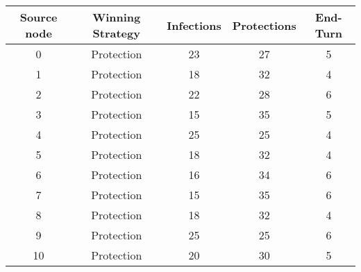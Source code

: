 \documentclass[results.tex]{subfiles}
\begin{document}
    \begin{center}
        \begin{tabular}{| c || c | c | c | c |}
            \hline
            {\bfseries Source node} & {\bfseries Winning Strategy} & {\bfseries Infections} & {\bfseries Protections}
            & {\bfseries End-Turn}
            \\  %
            \hline\hline
            0                       & Protection                   & 23                     & 27                      & 5                    \\
            \hline
            1                       & Protection                   & 18                     & 32                      & 4                    \\
            \hline
            2                       & Protection                   & 22                     & 28                      & 6                    \\
            \hline
            3                       & Protection                   & 15                     & 35                      & 5                    \\
            \hline
            4                       & Protection                   & 25                     & 25                      & 4                    \\
            \hline
            5                       & Protection                   & 18                     & 32                      & 4                    \\
            \hline
            6                       & Protection                   & 16                     & 34                      & 6                    \\
            \hline
            7                       & Protection                   & 15                     & 35                      & 6                    \\
            \hline
            8                       & Protection                   & 18                     & 32                      & 4                    \\
            \hline
            9                       & Protection                   & 25                     & 25                      & 6                    \\
            \hline
            10                      & Protection                   & 20                     & 30                      & 5                    \\

\end{tabular}
\end{center}
\end{document}
